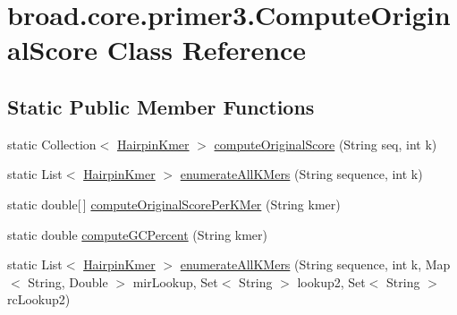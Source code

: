 \hypertarget{classbroad_1_1core_1_1primer3_1_1_compute_original_score}{\section{broad.\+core.\+primer3.\+Compute\+Original\+Score Class Reference}
\label{classbroad_1_1core_1_1primer3_1_1_compute_original_score}
}
\subsection*{Static Public Member Functions}
\begin{DoxyCompactItemize}
\item 
static Collection$<$ \hyperlink{classbroad_1_1core_1_1primer3_1_1_hairpin_kmer}{Hairpin\+Kmer} $>$ \hyperlink{classbroad_1_1core_1_1primer3_1_1_compute_original_score_ac0a5a237e3b52c5fdeaf7a74d1828986}{compute\+Original\+Score} (String seq, int k)
\item 
static List$<$ \hyperlink{classbroad_1_1core_1_1primer3_1_1_hairpin_kmer}{Hairpin\+Kmer} $>$ \hyperlink{classbroad_1_1core_1_1primer3_1_1_compute_original_score_a6ea4d2d9fb16c7555c9e7156cdfa5397}{enumerate\+All\+K\+Mers} (String sequence, int k)
\item 
static double\mbox{[}$\,$\mbox{]} \hyperlink{classbroad_1_1core_1_1primer3_1_1_compute_original_score_ad638c89f72ea2e8e1f4e602ca5b6ca26}{compute\+Original\+Score\+Per\+K\+Mer} (String kmer)
\item 
static double \hyperlink{classbroad_1_1core_1_1primer3_1_1_compute_original_score_a437266c034c972266b211060a846c495}{compute\+G\+C\+Percent} (String kmer)
\item 
static List$<$ \hyperlink{classbroad_1_1core_1_1primer3_1_1_hairpin_kmer}{Hairpin\+Kmer} $>$ \hyperlink{classbroad_1_1core_1_1primer3_1_1_compute_original_score_acd3226842a1c73d1cb121182540b115f}{enumerate\+All\+K\+Mers} (String sequence, int k, Map$<$ String, Double $>$ mir\+Lookup, Set$<$ String $>$ lookup2, Set$<$ String $>$ rc\+Lookup2)
\end{DoxyCompactItemize}


